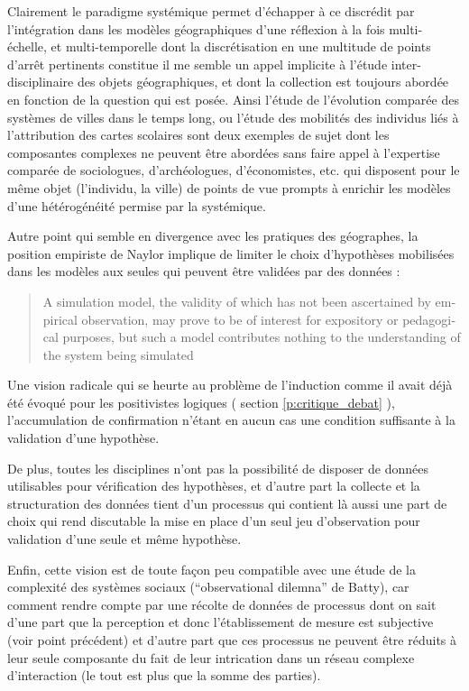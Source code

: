 Clairement le paradigme systémique permet d'échapper à ce discrédit par l'intégration dans les modèles géographiques d'une réflexion à la fois multi-échelle, et multi-temporelle \autocite{Dastes2001a} dont la discrétisation en une multitude de points d’arrêt pertinents constitue il me semble un appel implicite à l'étude inter-disciplinaire des objets géographiques, et dont la collection est toujours abordée en fonction de la question qui est posée. Ainsi l'étude de l'évolution comparée des systèmes de villes dans le temps long, ou l'étude des mobilités des individus liés à l'attribution des cartes scolaires sont deux exemples de sujet dont les composantes complexes ne peuvent être abordées sans faire appel à l'expertise comparée de sociologues, d'archéologues, d'économistes, etc. qui disposent pour le même objet (l'individu, la ville) de points de vue prompts à enrichir les modèles d'une hétérogénéité permise par la systémique.

Autre point qui semble en divergence avec les pratiques des géographes, la position empiriste de Naylor implique de limiter le choix d'hypothèses mobilisées dans les modèles aux seules qui peuvent être validées par des données : \foreignblockquote{english}[\cite{Naylor1967}]{A simulation model, the validity of which has not been ascertained by empirical observation, may prove to be of interest for expository or pedagogical purposes, but such a model contributes nothing to the understanding of the system being simulated} 

Une vision radicale qui se heurte au problème de l'induction comme il avait déjà été évoqué pour les positivistes logiques ( section \ref{p:critique_debat} ), l'accumulation de confirmation n'étant en aucun cas une condition suffisante à la validation d'une hypothèse.

De plus, toutes les disciplines n'ont pas la possibilité de disposer de données utilisables pour vérification des hypothèses, et d'autre part la collecte et la structuration des données tient d'un processus qui contient là aussi une part de choix qui rend discutable la mise en place d'un seul jeu d'observation pour validation d'une seule et même hypothèse.

Enfin, cette vision est de toute façon peu compatible avec une étude de la complexité des systèmes sociaux (\foreignquote{english}{observational dilemna} de Batty), car comment rendre compte par une récolte de données de processus dont on sait d'une part que la perception et donc l'établissement de mesure est subjective (voir point précédent) et d'autre part que ces processus ne peuvent être réduits à leur seule composante du fait de leur intrication dans un réseau complexe d'interaction (le tout est plus que la somme des parties).


